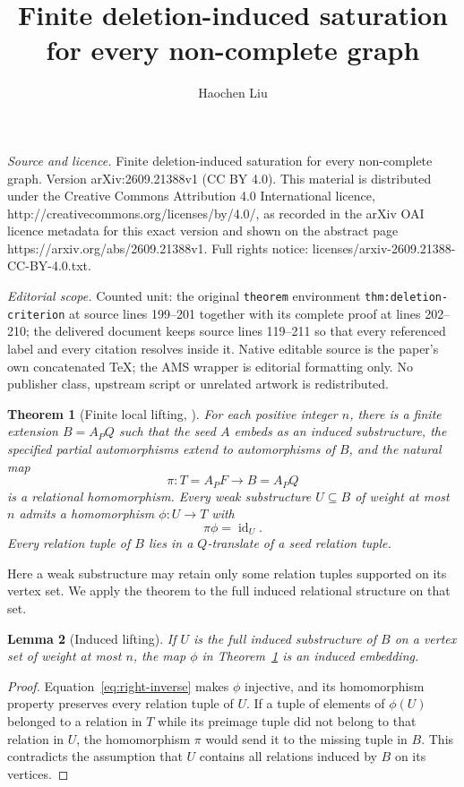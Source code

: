 \documentclass[10pt,a4paper]{amsart}
\newtheorem{theorem}{Theorem}[section]
\newtheorem{lemma}[theorem]{Lemma}
\newcommand{\id}{\operatorname{id}}
\begin{document}
\title[Finite deletion-induced saturation for every non-complete gr]{Finite deletion-induced saturation for every non-complete graph}
\author{Haochen Liu}
\date{}
\maketitle
\noindent\emph{Source and licence.} Finite deletion-induced saturation for every non-complete graph. Version arXiv:2609.21388v1 (CC BY 4.0). This material is distributed under the Creative Commons Attribution 4.0 International licence, http://creativecommons.org/licenses/by/4.0/, as recorded in the arXiv OAI licence metadata for this exact version and shown on the abstract page https://arxiv.org/abs/2609.21388v1. Full rights notice: licenses/arxiv-2609.21388-CC-BY-4.0.txt.\par\smallskip
\noindent\textit{Editorial scope.} Counted unit: the original \texttt{theorem} environment \texttt{thm:deletion-criterion} at source lines 199--201 together with its complete proof at lines 202--210; the delivered document keeps source lines 119--211 so that every referenced label and every citation resolves inside it. Native editable source is the paper's own concatenated TeX; the AMS wrapper is editorial formatting only. No publisher class, upstream script or unrelated artwork is redistributed.
\begin{theorem}[Finite local lifting, {\cite[Theorem~4.19]{ABO}}]\label{thm:lifting}
For each positive integer $n$, there is a finite extension $B=A_PQ$ such that the seed $A$ embeds as an induced substructure, the specified partial automorphisms extend to automorphisms of $B$, and the natural map
\[
 \pi:T=A_PF\longrightarrow B=A_PQ
\]
is a relational homomorphism. Every weak substructure $U\subseteq B$ of weight at most $n$ admits a homomorphism $\phi:U\to T$ with
\begin{equation}\label{eq:right-inverse}
 \pi\phi=\id_U.
\end{equation}
Every relation tuple of $B$ lies in a $Q$-translate of a seed relation tuple.
\end{theorem}

Here a weak substructure may retain only some relation tuples supported on its vertex set. We apply the theorem to the full induced relational structure on that set.

\begin{lemma}[Induced lifting]\label{lem:induced-lifting}
If $U$ is the full induced substructure of $B$ on a vertex set of weight at most $n$, the map $\phi$ in Theorem~\ref{thm:lifting} is an induced embedding.
\end{lemma}
\begin{proof}
Equation~\eqref{eq:right-inverse} makes $\phi$ injective, and its homomorphism property preserves every relation tuple of $U$. If a tuple of elements of $\phi(U)$ belonged to a relation in $T$ while its preimage tuple did not belong to that relation in $U$, the homomorphism $\pi$ would send it to the missing tuple in $B$. This contradicts the assumption that $U$ contains all relations induced by $B$ on its vertices.
\end{proof}
\end{document}
